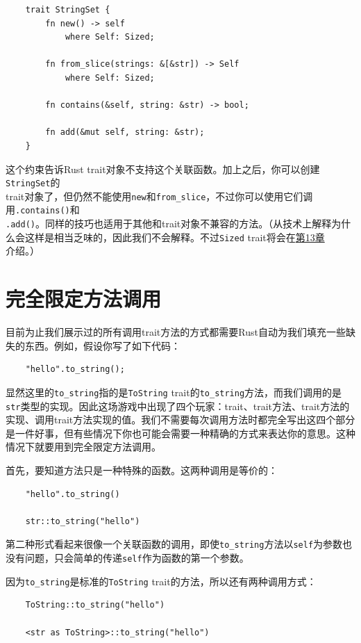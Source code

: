 \begin{verbatim}
    trait StringSet {
        fn new() -> self
            where Self: Sized;

        fn from_slice(strings: &[&str]) -> Self
            where Self: Sized;

        fn contains(&self, string: &str) -> bool;

        fn add(&mut self, string: &str);
    }
\end{verbatim}

这个约束告诉Rust trait对象不支持这个关联函数。加上之后，你可以创建\texttt{StringSet}的\\
trait对象了，但仍然不能使用\texttt{new}和\texttt{from\_slice}，不过你可以使用它们调用\texttt{.contains()}和\\
\texttt{.add()}。同样的技巧也适用于其他和trait对象不兼容的方法。（从技术上解释为什么会这样是相当乏味的，因此我们不会解释。不过\texttt{Sized} trait将会在\hyperref[ch13]{第13章}介绍。）

\section{完全限定方法调用}\label{fullymethod}

目前为止我们展示过的所有调用trait方法的方式都需要Rust自动为我们填充一些缺失的东西。例如，假设你写了如下代码：
\begin{verbatim}
    "hello".to_string();
\end{verbatim}

显然这里的\texttt{to\_string}指的是\texttt{ToString} trait的\texttt{to\_string}方法，而我们调用的是\texttt{str}类型的实现。因此这场游戏中出现了四个玩家：trait、trait方法、trait方法的实现、调用trait方法实现的值。我们不需要每次调用方法时都完全写出这四个部分是一件好事，但有些情况下你也可能会需要一种精确的方式来表达你的意思。这种情况下就要用到完全限定方法调用。

首先，要知道方法只是一种特殊的函数。这两种调用是等价的：
\begin{verbatim}
    "hello".to_string()

    str::to_string("hello")
\end{verbatim}

第二种形式看起来很像一个关联函数的调用，即使\texttt{to\_string}方法以\texttt{self}为参数也没有问题，只会简单的传递\texttt{self}作为函数的第一个参数。

因为\texttt{to\_string}是标准的\texttt{ToString} trait的方法，所以还有两种调用方式：
\begin{verbatim}
    ToString::to_string("hello")

    <str as ToString>::to_string("hello")
\end{verbatim}

